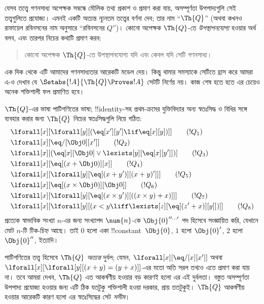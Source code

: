 \documentclass[../../../include/open-logic-section]{subfiles}
\begin{document}

যেসব তত্ত্বে গণনসাধ্য অপেক্ষক সম্বন্ধে মৌলিক তথ্য প্রকাশ ও প্রমাণ করা যায়,
অসম্পূর্ণতা উপপাদ্যগুলি সেই তত্ত্বগুলিতে প্রযোজ্য। এমনই একটি অত্যন্ত ন্যূনতম
তত্ত্বের বর্ণনা দেব; তার নাম ``$\Th{Q}$'' (অথবা কখনও রাফায়েল রবিনসনের নাম
অনুসারে ``রবিনসনের $Q$'')। কোনো অপেক্ষক $\Th{Q}$-তে
\emph{উপস্থাপনযোগ্য} হওয়ার অর্থ বলব, এবং তারপর নিচের কথাটি প্রমাণ করব:
\begin{quote}
  কোনো অপেক্ষক $\Th{Q}$-তে উপস্থাপনযোগ্য যদি এবং কেবল যদি সেটি গণনসাধ্য।
\end{quote}
এক দিক থেকে এটি আমাদের গণনসাধ্যতার আরেকটি মডেল দেয়। কিন্তু থামার সমস্যাকে
সেটিতে হ্রাস করে আমরা এ-ও দেখাব যে
$\Setabs{!A}{\Th{Q} \Proves !A}$ সেটটি নির্ণেয় নয়। কাজ শেষ হতে হতে এর
চেয়েও অনেক শক্তিশালী ফল প্রমাণিত হবে।

$\Th{Q}$-এর ভাষা পাটিগণিতের ভাষা; !!{identity}-সহ প্রথম-ক্রমের যুক্তিবিদ্যার অন্য
স্বতঃসিদ্ধ ও বিধির সঙ্গে ব্যবহার করার জন্য $\Th{Q}$ নিচের স্বতঃসিদ্ধগুলি নিয়ে
গঠিত:
\begin{align*}
& \lforall[x][\lforall[y][(\eq[x'][y'] \lif \eq[x][y])]] \tag{$!Q_1$}\\
& \lforall[x][\eq/[\Obj 0][x']] \tag{$!Q_2$}\\
& \lforall[x][(\eq[x][\Obj 0] \lor \lexists[y][\eq[x][y']])] \tag{$!Q_3$}\\
& \lforall[x][\eq[(x + \Obj 0)][x]] \tag{$!Q_4$}\\
& \lforall[x][\lforall[y][\eq[(x + y')][(x + y)']]] \tag{$!Q_5$}\\
& \lforall[x][\eq[(x \times \Obj 0)][\Obj 0]] \tag{$!Q_6$}\\
& \lforall[x][\lforall[y][\eq[(x \times y')][((x \times y) + x)]]] \tag{$!Q_7$}\\
& \lforall[x][\lforall[y][(x < y \liff \lexists[z][\eq[(z' + x)][y]])]] \tag{$!Q_8$}
\end{align*}
প্রত্যেক স্বাভাবিক সংখ্যা $n$-এর জন্য সংখ্যাপদ $\num{n}$-কে
$\Obj{0}^{\prime\prime\ldots\prime}$ পদ হিসেবে সংজ্ঞায়িত করি, যেখানে মোট
$n$-টি টিক-চিহ্ন আছে। তাই $\num{0}$ হলো একা !!{constant}~$\Obj{0}$,
$\num{1}$ হলো $\Obj{0}'$, $\num{2}$ হলো $\Obj{0}''$, ইত্যাদি।

পাটিগণিতের তত্ত্ব হিসেবে $\Th{Q}$ \emph{অত্যন্ত} দুর্বল; যেমন,
$\lforall[x][\eq/[x][x']]$ অথবা $\lforall[x][\lforall[y][(x + y) = (y +
    x)]]$-এর মতো অতি সরল তথ্যও এতে প্রমাণ করা যায় না। তবে আমরা দেখব,
$\Th{Q}$ এত আকর্ষণীয় হওয়ার বড় কারণই হলো এর এই দুর্বলতা। বস্তুত অসম্পূর্ণতা
উপপাদ্য প্রযোজ্য হওয়ার জন্য এটি ঠিক যতটুকু শক্তিশালী হওয়া দরকার, প্রায়
ততটুকুই। $\Th{Q}$ আকর্ষণীয় হওয়ার আরেকটি কারণ হলো এর স্বতঃসিদ্ধের সেট
\emph{সসীম}।
\end{document}
